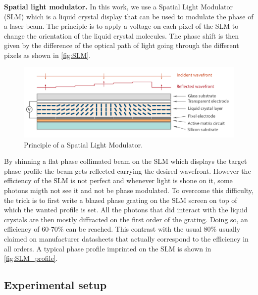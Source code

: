 \bigskip

\textbf{Spatial light modulator.} In this work, we use a Spatial Light Modulator (SLM) which is a liquid crystal display that can be used to modulate the phase of a laser beam. The principle is to apply a voltage on each pixel of the SLM to change the orientation of the liquid crystal molecules. 
The phase shift is then given by the difference of the optical path of light going through the different pixels as shown in \autoref{fig:SLM}. 

\begin{figure}
    \centering
    \includegraphics[width=1\textwidth]{chap3_custom_st/fig/SLMprinciple.png}
    \caption{Principle of a Spatial Light Modulator.}
    \label{fig:SLM}
\end{figure}

\noindent By shinning a flat phase collimated beam on the SLM which displays the target phase profile the beam gets reflected carrying the desired wavefront.
However the efficiency of the SLM is not perfect and whenever light is shone on it, some photons migth not see it and not be phase modulated. To overcome this difficulty,
the trick is to first write a blazed phase grating on the SLM screen on top of which the wanted profile is set. All the photons that did interact with the liquid crystals are then mostly diffracted on the first order of the grating. Doing so,
an efficiency of 60-70\% can be reached. This contrast with the usual 80\% usually claimed on manufacturer datasheets that actually correspond to the efficiency in all orders. A typical phase profile imprinted on the SLM is shown
in \autoref{fig:SLM_profile}.



\subsection{Experimental setup}

